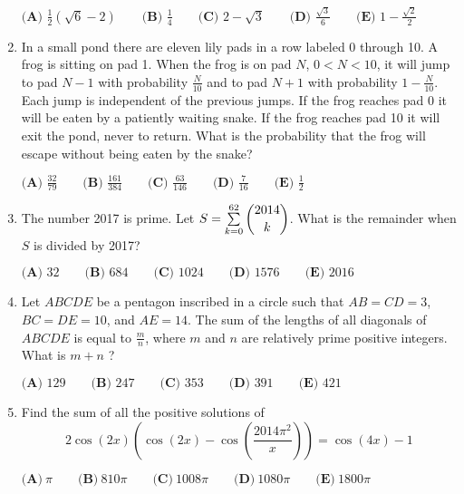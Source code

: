 \documentclass{article}
\begin{document}
\begin{enumerate}[label=\arabic*., itemsep=0.5em]
\( \textbf{(A) }\frac{1}{2}(\sqrt{6}-2)\qquad\textbf{(B) }\frac{1}{4}\qquad\textbf{(C) }2-\sqrt{3}\qquad\textbf{(D) }\frac{\sqrt{3}}{6}\qquad\textbf{(E) } 1-\frac{\sqrt{2}}{2}\)\par \vspace{0.5em}\item In a small pond there are eleven lily pads in a row labeled 0 through 10.  A frog is sitting on pad 1.  When the frog is on pad \(N\), \(0<N<10\), it will jump to pad \(N-1\) with probability \(\frac{N}{10}\) and to pad \(N+1\) with probability \(1-\frac{N}{10}\).  Each jump is independent of the previous jumps.  If the frog reaches pad 0 it will be eaten by a patiently waiting snake.  If the frog reaches pad 10 it will exit the pond, never to return.  What is the probability that the frog will escape without being eaten by the snake?

\(\textbf{(A) }\frac{32}{79}\qquad
\textbf{(B) }\frac{161}{384}\qquad
\textbf{(C) }\frac{63}{146}\qquad
\textbf{(D) }\frac{7}{16}\qquad
\textbf{(E) }\frac{1}{2}\qquad\)\par \vspace{0.5em}\item The number 2017 is prime.  Let \(S = \sum \limits_{k=0}^{62} \dbinom{2014}{k}\).  What is the remainder when \(S\) is divided by 2017?

\(\textbf{(A) }32\qquad
\textbf{(B) }684\qquad
\textbf{(C) }1024\qquad
\textbf{(D) }1576\qquad
\textbf{(E) }2016\qquad\)\par \vspace{0.5em}\item Let \(ABCDE\) be a pentagon inscribed in a circle such that \(AB = CD = 3\), \(BC = DE = 10\), and \(AE= 14\).  The sum of the lengths of all diagonals of \(ABCDE\) is equal to \(\frac{m}{n}\), where \(m\) and \(n\) are relatively prime positive integers.  What is \(m+n\) ?

\(\textbf{(A) }129\qquad
\textbf{(B) }247\qquad
\textbf{(C) }353\qquad
\textbf{(D) }391\qquad
\textbf{(E) }421\qquad\)\par \vspace{0.5em}\item Find the sum of all the positive solutions of 
\begin{equation*}
2\cos(2x) \left(\cos(2x) - \cos\left( \frac{2014\pi^2}{x} \right)\right) = \cos(4x) - 1
\end{equation*}


\( \textbf{(A)}\ \pi \qquad\textbf{(B)}\ 810\pi  \qquad\textbf{(C)}\ 1008\pi \qquad\textbf{(D)}\ 1080 \pi \qquad\textbf{(E)}\ 1800\pi \)\par \vspace{0.5em}\end{enumerate}
\end{document}
